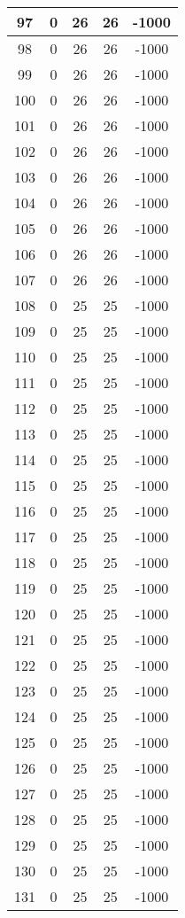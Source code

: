 \documentclass[letterpaper, 12pt]{article}
\begin{document}
\begin{longtable}{|c|c|c|c|c|}
\hline
97 & 0 & 26 & 26 & -1000 \\
\hline
98 & 0 & 26 & 26 & -1000 \\
\hline
99 & 0 & 26 & 26 & -1000 \\
\hline
100 & 0 & 26 & 26 & -1000 \\
\hline
101 & 0 & 26 & 26 & -1000 \\
\hline
102 & 0 & 26 & 26 & -1000 \\
\hline
103 & 0 & 26 & 26 & -1000 \\
\hline
104 & 0 & 26 & 26 & -1000 \\
\hline
105 & 0 & 26 & 26 & -1000 \\
\hline
106 & 0 & 26 & 26 & -1000 \\
\hline
107 & 0 & 26 & 26 & -1000 \\
\hline
108 & 0 & 25 & 25 & -1000 \\
\hline
109 & 0 & 25 & 25 & -1000 \\
\hline
110 & 0 & 25 & 25 & -1000 \\
\hline
111 & 0 & 25 & 25 & -1000 \\
\hline
112 & 0 & 25 & 25 & -1000 \\
\hline
113 & 0 & 25 & 25 & -1000 \\
\hline
114 & 0 & 25 & 25 & -1000 \\
\hline
115 & 0 & 25 & 25 & -1000 \\
\hline
116 & 0 & 25 & 25 & -1000 \\
\hline
117 & 0 & 25 & 25 & -1000 \\
\hline
118 & 0 & 25 & 25 & -1000 \\
\hline
119 & 0 & 25 & 25 & -1000 \\
\hline
120 & 0 & 25 & 25 & -1000 \\
\hline
121 & 0 & 25 & 25 & -1000 \\
\hline
122 & 0 & 25 & 25 & -1000 \\
\hline
123 & 0 & 25 & 25 & -1000 \\
\hline
124 & 0 & 25 & 25 & -1000 \\
\hline
125 & 0 & 25 & 25 & -1000 \\
\hline
126 & 0 & 25 & 25 & -1000 \\
\hline
127 & 0 & 25 & 25 & -1000 \\
\hline
128 & 0 & 25 & 25 & -1000 \\
\hline
129 & 0 & 25 & 25 & -1000 \\
\hline
130 & 0 & 25 & 25 & -1000 \\
\hline
131 & 0 & 25 & 25 & -1000 \\

\end{longtable}
\end{document}
